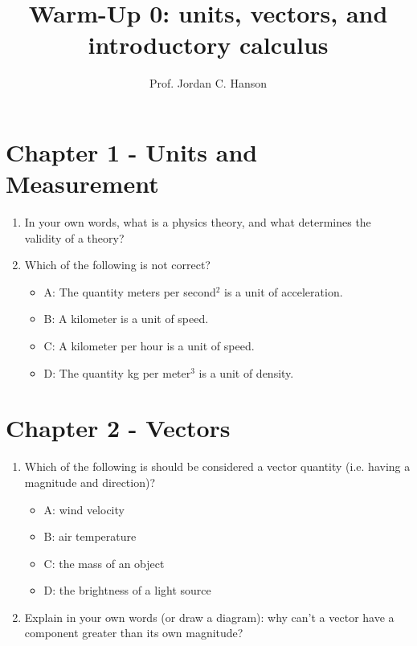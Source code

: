 \documentclass{article}
\begin{document}
\title{Warm-Up 0: units, vectors, and introductory calculus}
\author{Prof. Jordan C. Hanson}

\maketitle

\section{Chapter 1 - Units and Measurement}

\begin{enumerate}
\item In your own words, what is a physics theory, and what determines the validity of a theory? \\ \vspace{0.5cm}
\item Which of the following is not correct?
\begin{itemize}
\item A: The quantity meters per second$^2$ is a unit of acceleration.
\item B: A kilometer is a unit of speed.
\item C: A kilometer per hour is a unit of speed.
\item D: The quantity kg per meter$^3$ is a unit of density.
\end{itemize}
\end{enumerate}

\section{Chapter 2 - Vectors}

\begin{enumerate}
\item Which of the following is should be considered a vector quantity (i.e. having a magnitude and direction)?
\begin{itemize}
\item A: wind velocity
\item B: air temperature
\item C: the mass of an object
\item D: the brightness of a light source
\end{itemize}
\item Explain in your own words (or draw a diagram): why can't a vector have a component greater than its own magnitude? \\ \vspace{1cm}
\end{enumerate}
\end{document}
